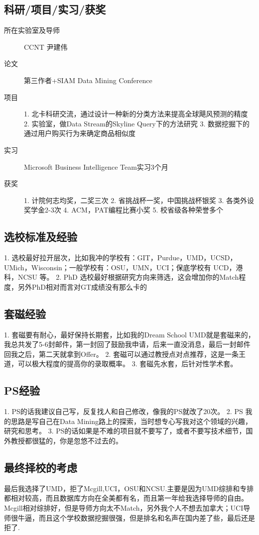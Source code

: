 \documentclass[11pt,fleqn,openany]{book} %
\begin{document}
\subsection*{科研/项目/实习/获奖}
\begin{description}
\item[所在实验室及导师] CCNT 尹建伟
\item[论文] 第三作者+SIAM Data Mining Conference
\item[项目] 1. 北卡科研交流，通过设计一种新的分类方法来提高全球飓风预测的精度
2. 实验室，做Data Stream的Skyline Query下的方法研究
3. 数据挖掘下的通过用户购买行为来确定商品相似度
\item[实习] Microsoft Business Intelligence Team实习3个月
\item[获奖] 1. 计院何志均奖，二奖三次
2. 省挑战杯一奖，中国挑战杯银奖
3. 各类外设奖学金2-3次
4. ACM，PAT编程比赛小奖
5. 校省级各种荣誉多个
\end{description}
\subsection*{选校标准及经验}
1. 选校最好拉开层次，比如我冲的学校有：GIT，Purdue，UMD，UCSD，UMich，Wisconsin；一般学校有：OSU，UMN，UCI；保底学校有 UCD，港科，NCSU 等。
2. PhD 选校最好根据研究方向来筛选，这会增加你的Match程度，另外PhD相对而言对GT成绩没有那么卡的
\subsection*{套磁经验}
1. 套磁要有耐心，最好保持长期套，比如我的Dream School UMD就是套磁来的，我总共发了5-6封邮件，第一封回了鼓励我申请，后来一直没消息，最后一封邮件回我之后，第二天就拿到Offer。
2. 套磁可以通过教授点对点推荐，这是一条王道，可以极大程度的提高你的录取概率。
3. 套磁先水套，后针对性学术套。
\subsection*{PS经验}
1. PS的话我建议自己写，反复找人和自己修改，像我的PS就改了20次。
2. PS 我的思路是写自己在Data Mining路上的探索，当时想专心写我对这个领域的兴趣，研究和思考。
3. PS的话如果是不难的项目就不要写了，或者不要写技术细节，国外教授都很猛的，你是忽悠不过去的。
\subsection*{最终择校的考虑}
最后我选择了UMD，拒了Mcgill,UCI，OSU和NCSU.主要是因为UMD综排和专排都相对较高，而且数据库方向在全美都有名，而且第一年给我选择导师的自由。Mcgill相对综排好，但是导师方向太不Match，另外我个人不想去加拿大；UCI导师很牛逼，而且这个学校数据挖掘很强，但是排名和名声在国内差了些，最后还是拒了.
\end{document}
